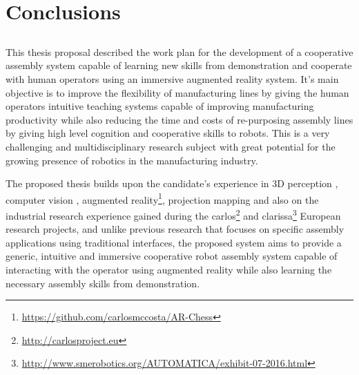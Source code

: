 \chapter{Conclusions}\label{chap:conclusions-and-future-work}



\section*{}

This thesis proposal described the work plan for the development of a cooperative assembly system capable of learning new skills from demonstration and cooperate with human operators using an immersive augmented reality system. It's main objective is to improve the flexibility of manufacturing lines by giving the human operators intuitive teaching systems capable of improving manufacturing productivity while also reducing the time and costs of re-purposing assembly lines by giving high level cognition and cooperative skills to robots. This is a very challenging and multidisciplinary research subject with great potential for the growing presence of robotics in the manufacturing industry.

The proposed thesis builds upon the candidate's experience in 3D perception \cite{Costa2015Diss,Costa2015ICIT,Costa2015Intech,Costa2016Elsevier}, computer vision \cite{Costa2014,Costa2016ICARSC}, augmented reality\footnote{\url{https://github.com/carlosmccosta/AR-Chess}}, projection mapping and also on the industrial research experience gained during the \gls{carlos}\footnote{\url{http://carlosproject.eu}} and \gls{clarissa}\footnote{\url{http://www.smerobotics.org/AUTOMATICA/exhibit-07-2016.html}} European research projects, and unlike previous research that focuses on specific assembly applications using traditional interfaces, the proposed system aims to provide a generic, intuitive and immersive cooperative robot assembly system capable of interacting with the operator using augmented reality while also learning the necessary assembly skills from demonstration.